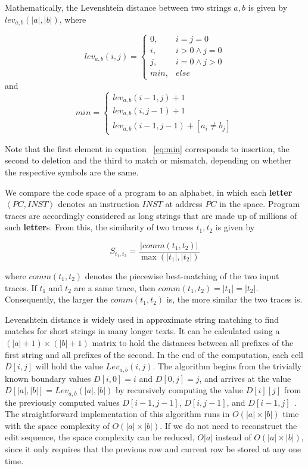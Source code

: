\documentclass[10pt,journal,cspaper,compsoc]{IEEEtran}
\begin{document}
Mathematically, the Levenshtein distance between two strings $a, b$
is given by $lev_{a,b}(|a|,|b|)$, where

\begin{equation}\label{eq:ed}
lev_{a,b}(i,j)=\begin{cases}
0, &i=j=0\\
i, &i>0\wedge j=0\\
j, &i=0\wedge j>0\\
min, &else
\end{cases}
\end{equation}
and
\begin{equation}\label{eq:min}
min=\begin{cases}
lev_{a,b}(i-1,j)+1 \\
lev_{a,b}(i, j-1)+1 \\
lev_{a,b}(i-1,j-1)+[a_i \ne b_j]
\end{cases}
\end{equation}

Note that the first element in equation ~\ref{eq:min} corresponds to
insertion, the second to deletion and the third to
match or mismatch, depending on whether the respective symbols are
the same.

We compare the code space of a program to an alphabet, in which each
\textbf{letter} $\left \langle PC, INST \right \rangle$ denotes an
instruction $INST$ at address $PC$ in the space. Program traces are
accordingly considered as long strings that are made up of millions
of such \textbf{letter}s. From this, the similarity of two traces
$t_{1}, t_{2}$ is given by

\begin{equation}\label{eq:sim}
 S_{t_{1},t_{2}} = \frac{|comm(t_1, t_2)|}{
 \max{(|t_1|,|t_{2}|)}}
\end{equation}

where $comm(t_1, t_2)$ denotes the piecewise best-matching of the
two input traces. If $t_1$ and $t_2$ are a same trace, then
$comm(t_1, t_2)=|t_1|=|t_2|$. Consequently, the larger the
$comm(t_1, t_2)$ is, the more similar the two traces is.


Levenshtein distance is widely used in approximate string matching
to find matches for short strings in many longer texts. It can be
calculated using a $(|a| + 1)\times (|b|+1)$  matrix to hold the
distances between all prefixes of the first string and all prefixes
of the second. In the end of the computation, each cell $D[i,j]$
will hold the value $Lev_{a,b}(i,j)$. The algorithm begins from the
trivially known boundary values $D[i,0]=i$ and $D[0,j]=j$, and
arrives at the value $D[|a|,|b|]=Lev_{a,b}(|a|,|b|)$ by recursively
computing the value $D[i][j]$ from the previously computed values
$D[i-1,j-1]$, $D[i,j-1]$, and $D[i-1,j]$~\cite{bit03}. The
straightforward implementation of this algorithm runs in
$O(|a|\times |b|)$ time with the space complexity of $O(|a|\times
|b|)$. If we do not need to reconstruct the edit sequence, the space
complexity can be reduced, $O|a|$ instead of $O(|a|\times |b|)$,
since it only requires that the previous row and current row be
stored at any one time.
\end{document}
